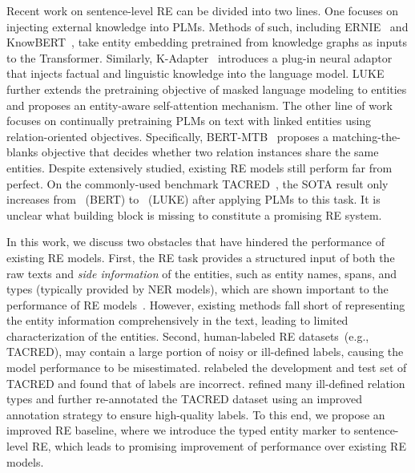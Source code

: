 \documentclass[11pt,a4paper]{article}
\begin{document}
Recent work on sentence-level RE can be divided into two lines.
One focuses on injecting external knowledge into PLMs.
Methods of such, including ERNIE~\cite{zhang-etal-2019-ernie} and KnowBERT~\cite{peters-etal-2019-knowledge}, take entity embedding pretrained from knowledge graphs as inputs to the Transformer.
Similarly, K-Adapter~\cite{wang2020k} introduces a plug-in neural adaptor that injects factual and linguistic knowledge into the language model.
LUKE~\cite{yamada-etal-2020-luke} further extends the pretraining objective of masked language modeling to entities and proposes an entity-aware self-attention mechanism.
The other line of work focuses on continually pretraining PLMs on text with linked entities using relation-oriented objectives.
Specifically, BERT-MTB~\cite{baldini-soares-etal-2019-matching} proposes a matching-the-blanks objective that decides whether two relation instances share the same entities.
Despite extensively studied, existing RE models still perform far from perfect.
On the commonly-used benchmark TACRED~\cite{zhang-etal-2017-position}, the SOTA  result only increases from ~(BERT) to ~(LUKE) after applying PLMs to this task.
It is unclear what building block is missing to constitute a promising RE system. 

In this work, we discuss two obstacles that have hindered the performance of existing RE models.
First, the RE task provides a structured input of both the raw texts and \emph{side information} of the entities, such as entity names, spans, and types (typically provided by NER models), which are shown important to the performance of RE models~\cite{peng-etal-2020-learning}.
However, existing methods fall short of representing the entity information comprehensively in the text, leading to limited characterization of the entities.
Second, human-labeled RE datasets~(e.g., TACRED), may contain a large portion of noisy or ill-defined labels, causing the model performance to be misestimated.
\citet{alt-etal-2020-tacred} relabeled the development and test set of TACRED and found that  of labels are incorrect.
\citet{stoica2021re} refined many ill-defined relation types and further re-annotated the TACRED dataset using an improved annotation strategy to ensure high-quality labels.
To this end, we propose an improved RE baseline, where we introduce the typed entity marker to sentence-level RE, which leads to promising improvement of performance over existing RE models.
\end{document}
